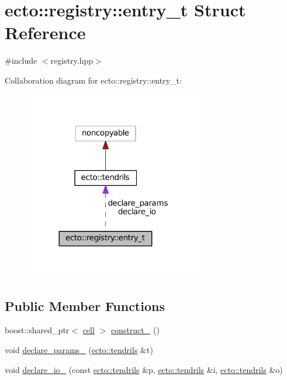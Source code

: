 \hypertarget{structecto_1_1registry_1_1entry__t}{}\section{ecto\+:\+:registry\+:\+:entry\+\_\+t Struct Reference}
\label{structecto_1_1registry_1_1entry__t}


{\ttfamily \#include $<$registry.\+hpp$>$}



Collaboration diagram for ecto\+:\+:registry\+:\+:entry\+\_\+t\+:\nopagebreak
\begin{figure}[H]
\begin{center}
\leavevmode
\includegraphics[width=221pt]{structecto_1_1registry_1_1entry__t__coll__graph}
\end{center}
\end{figure}
\subsection*{Public Member Functions}
\begin{DoxyCompactItemize}
\item 
boost\+::shared\+\_\+ptr$<$ \hyperlink{structecto_1_1cell}{cell} $>$ \hyperlink{structecto_1_1registry_1_1entry__t_a6690e4cc01562d27df2cca184cdd06e0}{construct\+\_\+} ()
\item 
void \hyperlink{structecto_1_1registry_1_1entry__t_af0aeb9fd69fc09b5a2b5f82841cba647}{declare\+\_\+params\+\_\+} (\hyperlink{classecto_1_1tendrils}{ecto\+::tendrils} \&t)
\item 
void \hyperlink{structecto_1_1registry_1_1entry__t_a079fd7bed79b335a8fa74c68a4ccf988}{declare\+\_\+io\+\_\+} (const \hyperlink{classecto_1_1tendrils}{ecto\+::tendrils} \&p, \hyperlink{classecto_1_1tendrils}{ecto\+::tendrils} \&i, \hyperlink{classecto_1_1tendrils}{ecto\+::tendrils} \&o)
\end{DoxyCompactItemize}
